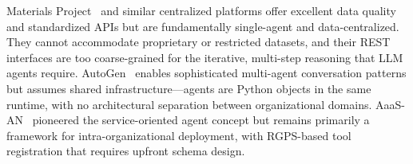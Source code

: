 \documentclass{article}
\begin{document}
\begin{table}[t]
\centering
\caption{Architectural Comparison}
\label{tab:comparison_v3}
\end{table}

Materials Project~\cite{jain2013} and similar centralized platforms offer excellent data quality and standardized APIs but are fundamentally single-agent and data-centralized. They cannot accommodate proprietary or restricted datasets, and their REST interfaces are too coarse-grained for the iterative, multi-step reasoning that LLM agents require. AutoGen~\cite{wu2023autogen} enables sophisticated multi-agent conversation patterns but assumes shared infrastructure---agents are Python objects in the same runtime, with no architectural separation between organizational domains. AaaS-AN~\cite{aaasan2025} pioneered the service-oriented agent concept but remains primarily a framework for intra-organizational deployment, with RGPS-based tool registration that requires upfront schema design.
\end{document}
